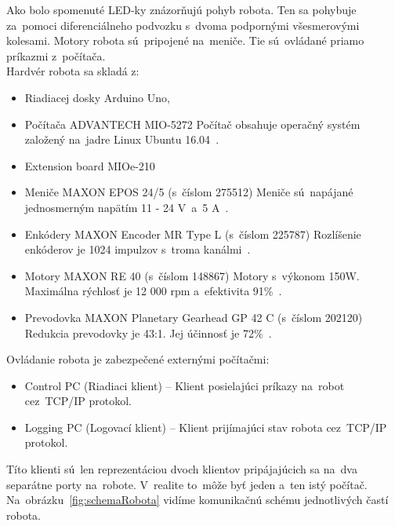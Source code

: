 \clearpage

Ako bolo spomenuté LED-ky znázorňujú pohyb robota. Ten sa pohybuje za~pomoci diferenciálneho podvozku s~dvoma
podpornými všesmerovými kolesami. Motory robota sú~pripojené na~meniče. Tie sú~ovládané priamo príkazmi z~počítača.\\

\noindent Hardvér robota sa skladá z:
\begin{itemize}
	\item Riadiacej dosky Arduino Uno,

	\item Počítača ADVANTECH MIO-5272 \newline
		Počítač obsahuje operačný systém založený na~jadre Linux Ubuntu 16.04~\cite{robotPc}.

	\item Extension board MIOe-210~\cite{extensionModule}

	\item Meniče MAXON EPOS 24/5 (s~číslom 275512) \newline
	 	Meniče sú~napájané jednosmerným napätím 11 - 24 V~a~5 A~\cite{menic}.

	\item Enkódery MAXON Encoder MR Type L (s~číslom 225787) \newline
		Rozlíšenie enkóderov je 1024 impulzov s~troma kanálmi~\cite{encoder}.

	\item Motory MAXON RE 40 (s~číslom 148867) \newline
		Motory s~výkonom 150W. Maximálna rýchlosť je 12 000 rpm a~efektivita 91\%~\cite{motor}.

	\item Prevodovka MAXON Planetary Gearhead GP 42 C (s~číslom 202120) \newline
		Redukcia prevodovky je 43:1. Jej účinnosť je 72\%~\cite{prevodovka}.
\end{itemize}

\noindent Ovládanie robota je zabezpečené externými počítačmi:
\begin{itemize}
	\item Control PC (Riadiaci klient) -- Klient posielajúci príkazy na~robot cez~TCP/IP protokol.
	\item Logging PC (Logovací klient) -- Klient prijímajúci stav robota cez~TCP/IP protokol.
\end{itemize}

\noindent Títo klienti sú~len reprezentáciou dvoch klientov pripájajúcich sa na~dva separátne porty na~robote.
V~realite to~môže byť jeden a~ten istý počítač. Na~obrázku~\ref{fig:schemaRobota} vidíme komunikačnú schému
jednotlivých častí robota.

